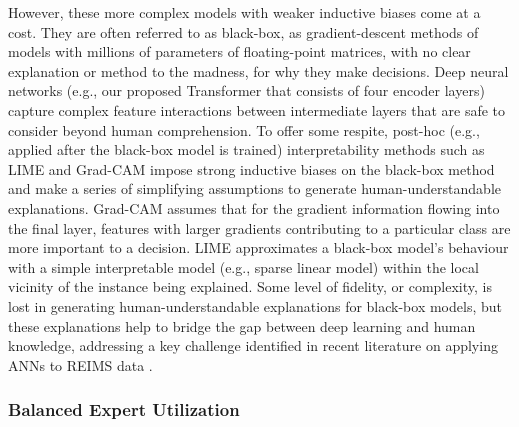 However, these more complex models with weaker inductive biases come at a cost. They are often referred to as black-box, as gradient-descent methods of models with millions of parameters of floating-point matrices, with no clear explanation or method to the madness, for why they make decisions. Deep neural networks (e.g., our proposed Transformer that consists of four encoder layers) capture complex feature interactions between intermediate layers that are safe to consider beyond human comprehension. To offer some respite, post-hoc (e.g., applied after the black-box model is trained) interpretability methods such as LIME and Grad-CAM impose strong inductive biases on the black-box method and make a series of simplifying assumptions to generate human-understandable explanations. Grad-CAM assumes that for the gradient information flowing into the final layer, features with larger gradients contributing to a particular class are more important to a decision. LIME approximates a black-box model's behaviour with a simple interpretable model (e.g., sparse linear model) within the local vicinity of the instance being explained. Some level of fidelity, or complexity, is lost in generating human-understandable explanations for black-box models, but these explanations help to bridge the gap between deep learning and human knowledge, addressing a key challenge identified in recent literature on applying ANNs to REIMS data \citep{Cardoso2025}.

\subsubsection{Balanced Expert Utilization}

